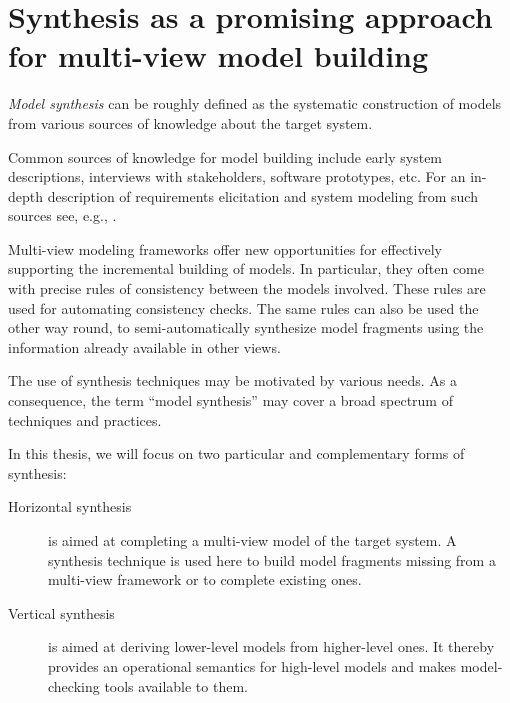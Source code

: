 \section{Synthesis as a promising approach for multi-view model building\label{section:intro-synthesis}}

\emph{Model synthesis} can be roughly defined as the systematic construction of models from various sources of knowledge about the target system. 

Common sources of knowledge for model building include early system descriptions, interviews with stakeholders, software prototypes, etc. For an in-depth description of requirements elicitation and system modeling from such sources see, e.g., \cite{VanLamsweerde:2009}.

Multi-view modeling frameworks offer new opportunities for effectively supporting the incremental building of models. In particular, they often come with precise rules of consistency between the models involved. These rules are used for automating consistency checks. The same rules can also be used the other way round, to semi-automatically synthesize model fragments using the information already available in other views.

The use of synthesis techniques may be motivated by various needs. As a consequence, the term ``model synthesis'' may cover a broad spectrum of techniques and practices. 

In this thesis, we will focus on two particular and complementary forms of synthesis:
\begin{description}
\item[Horizontal synthesis] is aimed at completing a multi-view model of the target system. A synthesis technique is used here to build model fragments missing from a multi-view framework or to complete existing ones.
\item[Vertical synthesis] is aimed at deriving lower-level models from higher-level ones. It thereby provides an operational semantics for high-level models and makes model-checking tools available to them.
\end{description}

